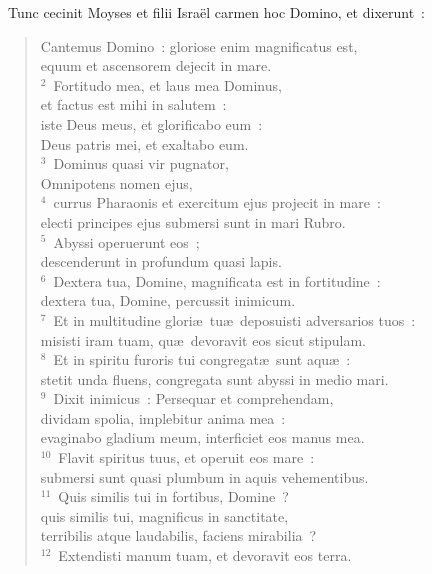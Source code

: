 ~Tunc cecinit Moyses et filii Isra\"el carmen hoc Domino, et dixerunt~: \begin{flushleft}\begin{verse}\vspace{6pt}Cantemus Domino~: gloriose enim magnificatus est,\\ equum et ascensorem dejecit in mare.\\
${}^{2}$~Fortitudo mea, et laus mea Dominus,\\ et factus est mihi in salutem~:\\ iste Deus meus, et glorificabo eum~:\\ Deus patris mei, et exaltabo eum.\\
${}^{3}$~Dominus quasi vir pugnator,\\ Omnipotens nomen ejus,\\
${}^{4}$~currus Pharaonis et exercitum ejus projecit in mare~:\\ electi principes ejus submersi sunt in mari Rubro.\\
${}^{5}$~Abyssi operuerunt eos~;\\ descenderunt in profundum quasi lapis.\\
${}^{6}$~Dextera tua, Domine, magnificata est in fortitudine~:\\ dextera tua, Domine, percussit inimicum.\\
${}^{7}$~Et in multitudine glori\ae\ tu\ae\ deposuisti adversarios tuos~:\\ misisti iram tuam, qu\ae\ devoravit eos sicut stipulam.\\
${}^{8}$~Et in spiritu furoris tui congregat\ae\ sunt aqu\ae~:\\ stetit unda fluens, congregata sunt abyssi in medio mari.\\
${}^{9}$~Dixit inimicus~: Persequar et comprehendam,\\ dividam spolia, implebitur anima mea~:\\ evaginabo gladium meum, interficiet eos manus mea.\\
${}^{10}$~Flavit spiritus tuus, et operuit eos mare~:\\ submersi sunt quasi plumbum in aquis vehementibus.\\
${}^{11}$~Quis similis tui in fortibus, Domine~?\\ quis similis tui, magnificus in sanctitate,\\ terribilis atque laudabilis, faciens mirabilia~?\\
${}^{12}$~Extendisti manum tuam, et devoravit eos terra.\\

\end{verse}
\end{flushleft}

